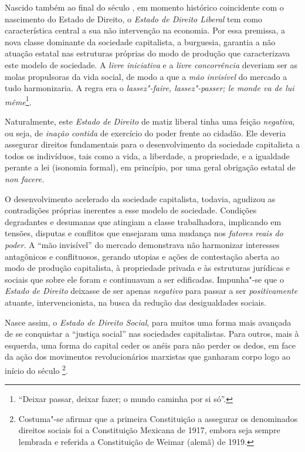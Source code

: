 Nascido também ao final do século , em momento histórico
coincidente com o nascimento do Estado de Direito, o \emph{Estado de
Direito Liberal} tem como característica central a sua não intervenção
na economia. Por essa premissa, a nova classe dominante da sociedade
capitalista, a burguesia, garantia a não atuação estatal nas estruturas
próprias do modo de produção que caracterizava este modelo de sociedade.
A \emph{livre iniciativa} e a \emph{livre concorrência} deveriam ser as
molas propulsoras da vida social, de modo a que a \emph{mão invisível}
do mercado a tudo harmonizaria. A regra era o \emph{lassez"-faire,
lassez"-passer; le monde va de lui même}\footnote{``Deixar
  passar, deixar fazer; o mundo caminha por si só''.}.

Naturalmente, este \emph{Estado de Direito} de matiz liberal tinha
uma feição \emph{negativa}, ou seja, de \emph{inação contida} de
exercício do poder frente ao cidadão. Ele deveria assegurar direitos
fundamentais para o desenvolvimento da sociedade capitalista a todos os
indivíduos, tais como a vida, a liberdade, a propriedade, e a igualdade
perante a lei (isonomia formal), em princípio, por uma geral obrigação
estatal de \emph{non facere.}

O desenvolvimento acelerado da sociedade capitalista, todavia, agudizou
as contradições próprias inerentes a esse modelo de sociedade. Condições
degradantes e desumanas que atingiam a classe trabalhadora, implicando
em tensões, disputas e conflitos que ensejaram uma mudança nos
\emph{fatores reais do poder}. A ``mão invisível'' do mercado
demonstrava não harmonizar interesses antagônicos e conflituosos,
gerando utopias e ações de contestação aberta ao modo de produção
capitalista, à propriedade privada e às estruturas jurídicas e sociais
que sobre ele foram e continuavam a ser edificadas. Impunha"-se que o
\emph{Estado de Direito} deixasse de ser apenas \emph{negativo} para
passar a ser \emph{positivamente} atuante, intervencionista, na busca da
redução das desigualdades sociais.

Nasce assim, o \emph{Estado de Direito Social}, para muitos uma forma
mais avançada de se conquistar a ``justiça social'' nas
sociedades capitalistas. Para outros, mais à esquerda, uma forma do
capital ceder os anéis para não perder os dedos, em face da ação dos
movimentos revolucionários marxistas que ganharam corpo logo ao início
do século \footnote{Costuma"-se afirmar que a primeira Constituição a
  assegurar os denominados direitos sociais foi a Constituição Mexicana
  de 1917, embora seja sempre lembrada e referida a Constituição de
  Weimar (alemã) de 1919.}.

